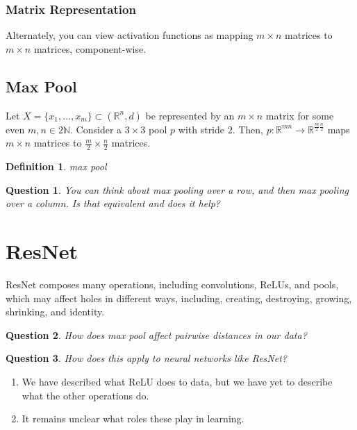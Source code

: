 \documentclass{article}
\newtheorem{definition}{Definition}
\newtheorem{question}{Question}
\newcommand{\N}{\mathbb{N}}
\newcommand{\R}{\mathbb{R}}
\begin{document}
\subsubsection{Matrix Representation}
Alternately, you can view activation functions as mapping $m\times n$ matrices to $m\times n$ matrices, component-wise.

\subsection{Max Pool}\label{sec:pool}
Let $X=\{x_1,\dots,x_m\}\subset(\R^n,d)$ be represented by an $m\times n$ matrix for some even $m,n\in 2\N$.
Consider a $3\times 3$ pool $p$ with stride $2$.
Then, $p:\R^{mn}\to\R^{\frac{m}{2}\frac{n}{2}}$ maps $m\times n$ matrices to $\frac{m}{2}\times\frac{n}{2}$ matrices.
\begin{definition}
max pool
\end{definition}

\begin{question}
You can think about max pooling over a row, and then max pooling over a column. Is that equivalent and does it help?
\end{question}


\section{ResNet}\label{sec:result}
ResNet composes many operations, including convolutions, ReLUs, and pools, which may affect holes in different ways, including, creating, destroying, growing, shrinking, and identity. 

\begin{question}
How does max pool affect pairwise distances in our data?
\end{question}

\begin{question}
How does this apply to neural networks like ResNet?
\end{question}
\begin{enumerate}
\item We have described what ReLU does to data, but we have yet to describe what the other operations do.
\item It remains unclear what roles these play in learning.
\end{enumerate}


\end{document}
